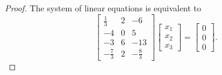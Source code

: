 \begin{proof}
    The system of linear equations is equivalent to
    \[
        \begin{bmatrix}
            \frac{1}{3}  & 2 & -6           \\
            -4           & 0 & 5            \\
            -3           & 6 & -13          \\
            -\frac{7}{3} & 2 & -\frac{8}{3}
        \end{bmatrix}
        \begin{bmatrix}
            x_{1} \\
            x_{2} \\
            x_{3}
        \end{bmatrix}
        =
        \begin{bmatrix}
            0 \\
            0 \\
            0
        \end{bmatrix}.
    \]


\end{proof}
